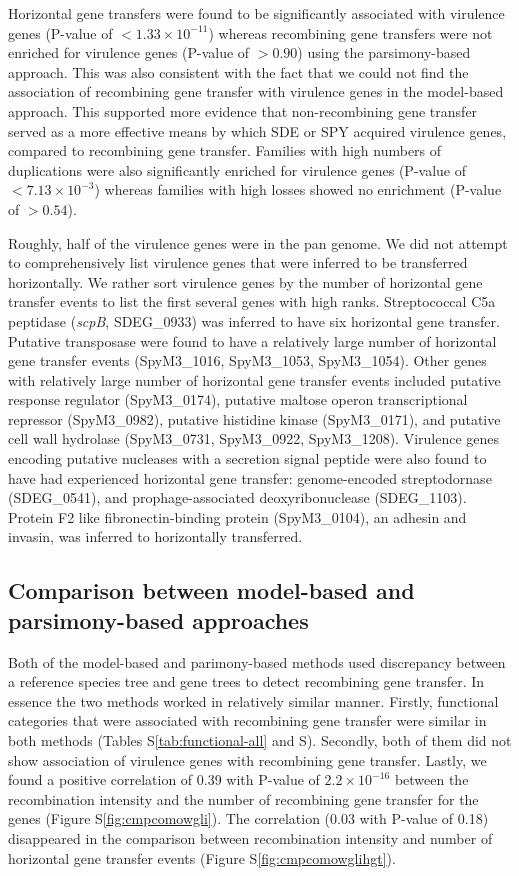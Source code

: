 \documentclass[english]{article}
\begin{document}
Horizontal gene transfers were found to be significantly associated with
virulence genes (P-value of $<1.33 \times 10^{-11}$) whereas recombining gene
transfers were not enriched for virulence genes (P-value of $>0.90$) using the
parsimony-based approach.  This was also consistent with the fact that we could
not find the association of recombining gene transfer with virulence genes in
the model-based approach.  This supported more evidence that non-recombining
gene transfer served as a more effective means by which SDE or SPY acquired
virulence genes, compared to recombining gene transfer.  
Families with high numbers of duplications were also significantly enriched for
virulence genes (P-value of $<7.13 \times 10^{-3}$) whereas families with high
losses showed no enrichment (P-value of $>0.54$). 

Roughly, half of the virulence genes were in the pan genome.  We did not attempt
to comprehensively list virulence genes that were inferred to be transferred
horizontally. We rather sort virulence genes by the number of horizontal gene
transfer events to list the first several genes with high ranks.  Streptococcal
C5a peptidase (\textit{scpB}, SDEG\_0933) was inferred to have six horizontal
gene transfer.  Putative transposase were found to have a relatively large
number of horizontal gene transfer events (SpyM3\_1016, SpyM3\_1053,
SpyM3\_1054). Other genes with relatively large number of horizontal gene
transfer events included putative response regulator (SpyM3\_0174), putative
maltose operon transcriptional repressor (SpyM3\_0982), putative histidine
kinase (SpyM3\_0171), and putative cell wall hydrolase (SpyM3\_0731,
SpyM3\_0922, SpyM3\_1208).  Virulence genes encoding putative nucleases with a
secretion signal peptide were also found to have had experienced horizontal gene
transfer: genome-encoded streptodornase (SDEG\_0541), and prophage-associated
deoxyribonuclease (SDEG\_1103).  Protein F2 like fibronectin-binding protein
(SpyM3\_0104), an adhesin and invasin, was inferred to horizontally
transferred.

\subsection{Comparison between model-based and parsimony-based approaches}

Both of the model-based and parimony-based methods used discrepancy between a
reference species tree and gene trees to detect recombining gene transfer. In
essence the two methods worked in relatively similar manner. Firstly, functional
categories that were associated with recombining gene transfer were similar in
both methods (Tables S\ref{tab:functional-all} and
S\label{tab:go-events-recombining}).  Secondly, both of them did not show
association of virulence genes with recombining gene transfer. Lastly, we found
a positive correlation of 0.39 with P-value of $2.2\times10^{-16}$ between the
recombination intensity and the number of recombining gene transfer for the
genes (Figure S\ref{fig:cmpcomowgli}).  The correlation (0.03 with P-value of
0.18) disappeared in the comparison between recombination intensity and number
of horizontal gene transfer events (Figure S\ref{fig:cmpcomowglihgt}).
\end{document}

